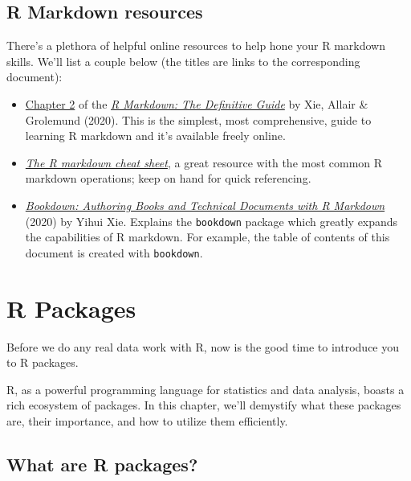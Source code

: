 \documentclass[
]{book}
\providecommand{\tightlist}{%
  \setlength{\itemsep}{0pt}\setlength{\parskip}{0pt}}
\begin{document}
\hypertarget{r-markdown-resources}{%
\section{R Markdown resources}\label{r-markdown-resources}}

There's a plethora of helpful online resources to help hone your R markdown skills. We'll list a couple below (the titles are links to the corresponding document):

\begin{itemize}
\tightlist
\item
  \href{https://bookdown.org/yihui/R\%20Markdown/basics.html}{Chapter 2} of the \href{https://bookdown.org/yihui/R\%20Markdown/}{\emph{R Markdown: The Definitive Guide}} by Xie, Allair \& Grolemund (2020). This is the simplest, most comprehensive, guide to learning R markdown and it's available freely online.
\item
  \href{https://rstudio.com/wp-content/uploads/2015/02/R\%20Markdown-cheatsheet.pdf}{\emph{The R markdown cheat sheet}}, a great resource with the most common R markdown operations; keep on hand for quick referencing.
\item
  \href{https://bookdown.org/yihui/bookdown/}{\emph{Bookdown: Authoring Books and Technical Documents with R Markdown}} (2020) by Yihui Xie. Explains the \texttt{bookdown} package which greatly expands the capabilities of R markdown. For example, the table of contents of this document is created with \texttt{bookdown}.
\end{itemize}

\hypertarget{r-packages}{%
\chapter{R Packages}\label{r-packages}}

Before we do any real data work with R, now is the good time to introduce you to R packages.

R, as a powerful programming language for statistics and data analysis, boasts a rich ecosystem of packages. In this chapter, we'll demystify what these packages are, their importance, and how to utilize them efficiently.

\hypertarget{what-are-r-packages}{%
\section{What are R packages?}\label{what-are-r-packages}}
\end{document}
